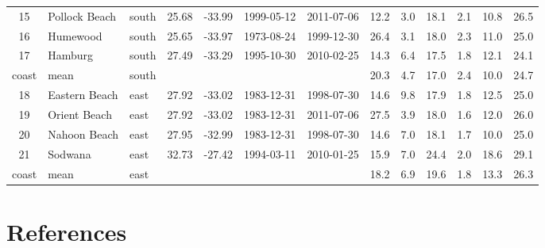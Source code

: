 \documentclass[a4paper,10pt,review]{elsarticle}
\begin{document}
\begin{table}[]
\begin{tabular}{cllcccccccccc}
15 & Pollock Beach & south & 25.68 & -33.99 & 1999-05-12 & 2011-07-06 & 12.2 & 3.0 & 18.1 & 2.1 & 10.8 & 26.5 \\
16 & Humewood & south & 25.65 & -33.97 & 1973-08-24 & 1999-12-30 & 26.4 & 3.1 & 18.0 & 2.3 & 11.0 & 25.0 \\
17 & Hamburg & south & 27.49 & -33.29 & 1995-10-30 & 2010-02-25 & 14.3 & 6.4 & 17.5 & 1.8 & 12.1 & 24.1 \\
coast & mean & south &  &  &  &  & 20.3 & 4.7 & 17.0 & 2.4 & 10.0 & 24.7 \\
18 & Eastern Beach & east & 27.92 & -33.02 & 1983-12-31 & 1998-07-30 & 14.6 & 9.8 & 17.9 & 1.8 & 12.5 & 25.0 \\
19 & Orient Beach & east & 27.92 & -33.02 & 1983-12-31 & 2011-07-06 & 27.5 & 3.9 & 18.0 & 1.6 & 12.0 & 26.0 \\
20 & Nahoon Beach & east & 27.95 & -32.99 & 1983-12-31 & 1998-07-30 & 14.6 & 7.0 & 18.1 & 1.7 & 10.0 & 25.0 \\
21 & Sodwana & east & 32.73 & -27.42 & 1994-03-11 & 2010-01-25 & 15.9 & 7.0 & 24.4 & 2.0 & 18.6 & 29.1 \\
coast & mean & east &  &  &  &  & 18.2 & 6.9 & 19.6 & 1.8 & 13.3 & 26.3 \\
   \hline
\end{tabular}
\end{table}

\section*{References}


\end{document}
